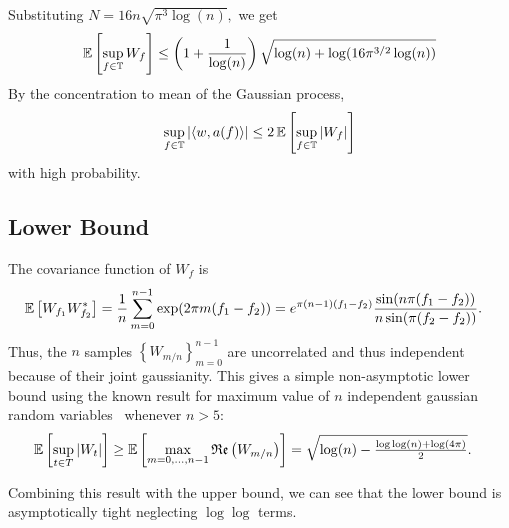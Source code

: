 Substituting $N = 16 n \sqrt{\pi^3 \log(n)},$ we get
\[
	\operatorname{\mathbb{E}}\left[\sup_{f \in \mathbb{T}} W_f \right] \leq \left( 1 + \frac{1}{\log(n)} \right)\sqrt{\log(n) + \log(16 \pi^{3/2} \log(n))}
\]
By the concentration to mean of the Gaussian process, 
\begin{equation}
\label{eq:gaussian-concentration}
\sup_{f \in \mathbb{T}} |\langle w, a(f)\rangle| \leq 2\operatorname{\mathbb{E}}\left[\sup_{f \in \mathbb{T}} |W_f| \right]
\end{equation} with high probability.
\subsection{Lower Bound}

The covariance function of $W_f$ is
\begin{align*}
\operatorname{\mathbb{E}}\left[W_{f_1} W_{f_2}^*\right] &= \frac{1}{n}\sum_{m=0}^{n-1} \exp(2\pi m (f_1 - f_2)) = e^{\pi (n - 1) (f_1-f_2)} \frac{\sin(n \pi (f_1 - f_2) ) }{ n \sin(\pi (f_2 - f_2))}.
\end{align*}
Thus, the $n$ samples $\left\{W_{m/n}\right\}_{m=0}^{n-1}$ are uncorrelated and thus independent because of their joint gaussianity. This gives a simple non-asymptotic lower bound using the known result for maximum value of $n$ independent gaussian random variables~\cite{lr76} whenever $n > 5$:
\begin{align*}
\operatorname{\mathbb{E}}\left[\sup_{t \in T} \left| W_t \right| \right] &\geq \operatorname{\mathbb{E}}\left[\max_{m = 0, \ldots, n-1} \mathop{\mathfrak{Re}}\left( W_{m/n} \right)  \right] = \sqrt{\log(n) - \tfrac{ \log\log(n) + \log(4\pi)}{2}}.
\end{align*}

Combining this result with the upper bound, we can see that the lower bound is asymptotically tight neglecting $\log\log$ terms.

